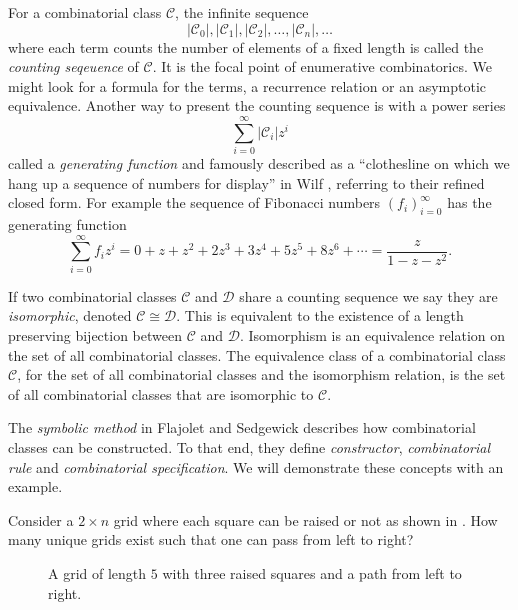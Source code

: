 For a combinatorial class $\mathcal{C}$, the infinite sequence 
\[
    |\mathcal{C}_0|, |\mathcal{C}_1|, |\mathcal{C}_2|,\dotsc,|\mathcal{C}_n|,\dotsc
\]
where each term counts the number of elements of a fixed length is called the \emph{counting seqeuence} of $\mathcal{C}$. It is the focal point of enumerative combinatorics. We might look for a formula for the terms, a recurrence relation or an asymptotic equivalence. Another way to present the counting sequence is with a power series
\[
    \sum_{i=0}^\infty |\mathcal{C}_i|z^i
\]
called a \emph{generating function} and famously described as a ``clothesline on which we hang up a sequence of numbers for display'' in Wilf \cite{wilf:gf}, referring to their refined closed form. For example the sequence of Fibonacci numbers $\left(f_i\right)_{i=0}^\infty$ has the generating function
\[
    \sum_{i=0}^\infty f_iz^i = 0 + z + z^2 + 2z^3 + 3z^4 + 5z^5 + 8z^6 + \dotsb = \frac{z}{1-z-z^2}.
\]

If two combinatorial classes $\mathcal{C}$ and $\mathcal{D}$ share a counting sequence we say they are \emph{isomorphic}, denoted $\mathcal{C} \cong \mathcal{D}$. This is equivalent to the existence of a length preserving bijection between $\mathcal{C}$ and $\mathcal{D}$. Isomorphism is an equivalence relation on the set of all combinatorial classes. The equivalence class of a combinatorial class $\mathcal{C}$, for the set of all combinatorial classes and the isomorphism relation, is the set of all combinatorial classes that are isomorphic to $\mathcal{C}$.

The \emph{symbolic method} in Flajolet and Sedgewick \cite{flajolet:ac} describes how combinatorial classes can be constructed. To that end, they define \emph{constructor}, \emph{combinatorial rule} and \emph{combinatorial specification}. We will demonstrate these concepts with an example. 

Consider a $2 \times n$ grid where each square can be raised or not as shown in . How many unique grids exist such that one can pass from left to right?

\begin{figure}[ht!]
    \centering
    
    \caption{A grid of length $5$ with three raised squares and a path from left to right.}
    \label{fig:raised_grid}
\end{figure}

